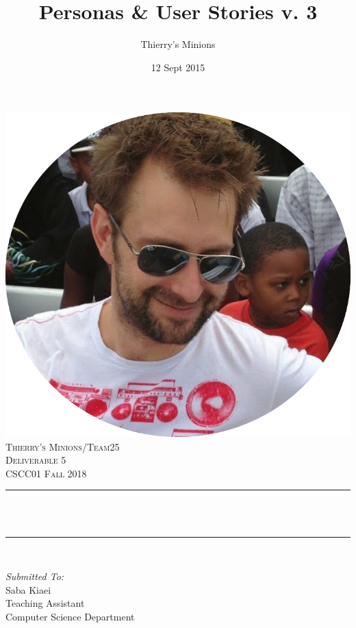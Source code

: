 \documentclass[12pt]{article}
\title{Personas \& User Stories v. 3}								%
\author{Thierry's Minions}								%
\date{12 Sept 2015}											%
\makeatletter
\let\thetitle\@title
\makeatother
\begin{document}

\begin{titlepage}
	\centering
    \vspace*{0.5 cm}
    \includegraphics[scale = 0.25]{leader.png}\\[1.0 cm]	%
    \textsc{\LARGE Thierry's Minions/Team25\\[0.5em] Deliverable 5}\\[2.0 cm]	
	\textsc{\Large CSCC01 Fall 2018}\\[0.5 cm]				%
	\rule{\linewidth}{0.2 mm} \\[0.4 cm]
	{ \huge \bfseries \thetitle}\\
	\rule{\linewidth}{0.2 mm} \\[1.5 cm]
	
	\begin{minipage}{0.4\textwidth}
		\begin{flushleft} \large
			\emph{Submitted To:}\\
			Saba Kiaei\\
            Teaching Assistant\\
            Computer Science Department\\
			\end{flushleft}
			\end{minipage}~
			\begin{minipage}{0.4\textwidth}
            

\end{minipage}
\end{titlepage}
\end{document}
